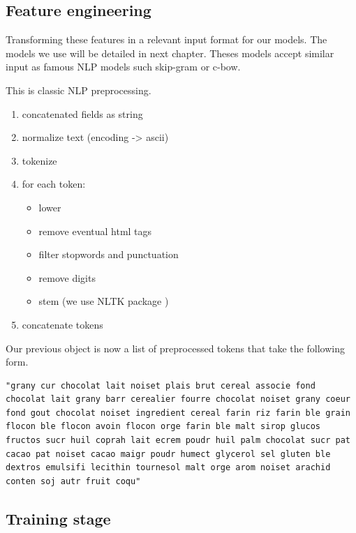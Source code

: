 \subsection{Feature engineering}

Transforming these features in a relevant input format for our models. 
The models we use will be detailed in next chapter. Theses models accept similar input as famous NLP models such skip-gram or c-bow.

This is classic NLP preprocessing.

\begin{enumerate}
	\item concatenated fields as string
	\item normalize text (encoding -> ascii)
	\item tokenize
	\item for each token:
	\begin{itemize}
		\item lower
		\item remove eventual html tags
		\item filter stopwords and punctuation
		\item remove digits
		\item stem (we use NLTK package \cite{NLTK})
	\end{itemize}
	\item concatenate tokens
\end{enumerate}

Our previous object is now a list of preprocessed tokens that take the following form.

\begin{verbatim}
"grany cur chocolat lait noiset plais brut cereal associe fond chocolat lait grany barr cerealier fourre chocolat noiset grany coeur fond gout chocolat noiset ingredient cereal farin riz farin ble grain flocon ble flocon avoin flocon orge farin ble malt sirop glucos fructos sucr huil coprah lait ecrem poudr huil palm chocolat sucr pat cacao pat noiset cacao maigr poudr humect glycerol sel gluten ble dextros emulsifi lecithin tournesol malt orge arom noiset arachid conten soj autr fruit coqu"
\end{verbatim}

\subsection{Training stage}

